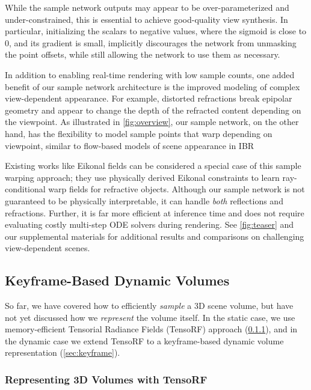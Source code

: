\documentclass[10pt,twocolumn,letterpaper]{article}
\begin{document}
{While the sample network outputs may appear to be over-parameterized and under-constrained, this is essential to achieve good-quality view synthesis.
In particular, initializing the scalars  to negative values, where the sigmoid is close to 0, and its gradient is small, implicitly discourages the network from unmasking the point offsets, while still allowing the network to use them as necessary.




In addition to enabling real-time rendering with low sample counts, one added benefit of our sample network architecture is the improved modeling of complex view-dependent appearance.
For example, distorted refractions break epipolar geometry and appear to change the depth of the refracted content depending on the viewpoint.
As illustrated in \cref{fig:overview}, our sample network, on the other hand, has the flexibility to model sample points that warp depending on viewpoint, similar to flow-based models of scene appearance in IBR~\cite{nieto2017linearizing}

Existing works like Eikonal fields \cite{BemanMFSR2022} can be considered a special case of this sample warping approach; they use physically derived Eikonal constraints to learn ray-conditional warp fields for refractive objects.
Although our sample network is not guaranteed to be physically interpretable, it can handle \textit{both} reflections and refractions. Further, it is far more efficient at inference time and does not require evaluating costly multi-step ODE solvers during rendering.
See \cref{fig:teaser} and our supplemental materials for additional results and comparisons on challenging view-dependent scenes.

\subsection{Keyframe-Based Dynamic Volumes}

So far, we have covered how to efficiently \textit{sample} a 3D scene volume, but have not yet discussed how we \textit{represent} the volume itself.
In the static case, we use memory-efficient Tensorial Radiance Fields (TensoRF) approach (\cref{sec:tensorialradiancefields}), and in the dynamic case we extend TensoRF to a keyframe-based dynamic volume representation (\cref{sec:keyframe}).


\subsubsection{Representing 3D Volumes with TensoRF~\cite{ChenXGYS2022}}
\label{sec:tensorialradiancefields}

}
\end{document}
